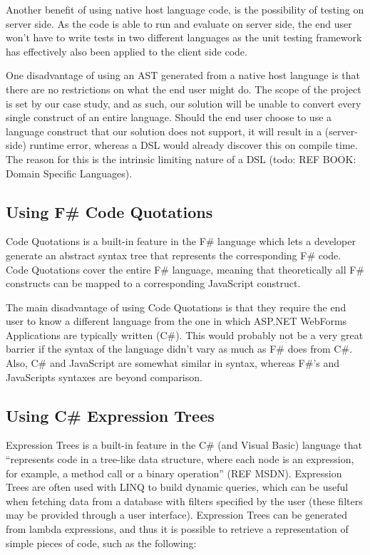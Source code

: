 		Another benefit of using native host language code, is the possibility of testing on server side. As the code is able to run and evaluate on server side, the end user won’t have to write tests in two different languages as the unit testing framework has effectively also been applied to the client side code.

		One disadvantage of using an AST generated from a native host language is that there are no restrictions on what the end user might do. The scope of the project is set by our case study, and as such, our solution will be unable to convert every single construct of an entire language. Should the end user choose to use a language construct that our solution does not support, it will result in a (server-side) runtime error, whereas a DSL would already discover this on compile time. The reason for this is the intrinsic limiting nature of a DSL (todo: REF BOOK: Domain Specific Languages).

		\subsection{Using F\# Code Quotations} %
		\label{sub:using_fs_code_quotations}
		
			Code Quotations is a built-in feature in the F\# language which lets a developer generate an abstract syntax tree that represents the corresponding F\# code. Code Quotations cover the entire F\# language, meaning that theoretically all F\# constructs can be mapped to a corresponding JavaScript construct.

			The main disadvantage of using Code Quotations is that they require the end user to know a different language from the one in which ASP.NET WebForms Applications are typically written (C\#). This would probably not be a very great barrier if the syntax of the language didn’t vary as much as F\# does from C\#. Also, C\# and JavaScript are somewhat similar in syntax, whereas F\#'s and JavaScripts syntaxes are beyond comparison.

		\subsection{Using C\# Expression Trees} %
		\label{sub:using_cs_expression_trees}
			Expression Trees is a built-in feature in the C\# (and Visual Basic) language that “represents code in a tree-like data structure, where each node is an expression, for example, a method call or a binary operation” (REF MSDN). Expression Trees are often used with LINQ to build dynamic queries, which can be useful when fetching data from a database with filters specified by the user (these filters may be provided through a user interface). Expression Trees can be generated from lambda expressions, and thus it is possible to retrieve a representation of simple pieces of code, such as the following:

